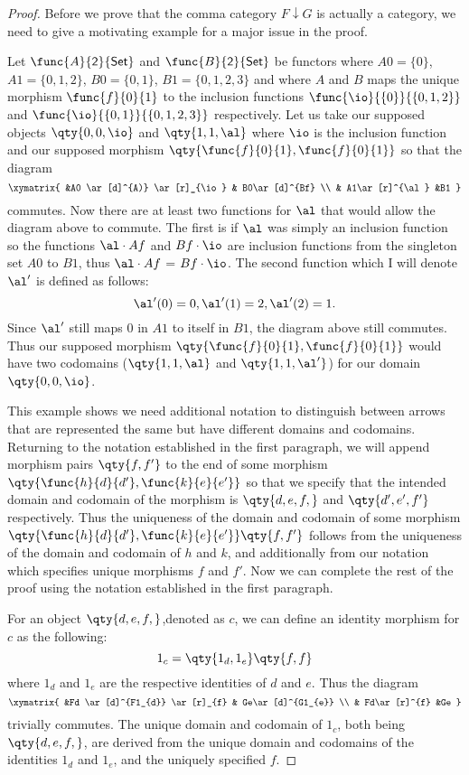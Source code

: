 \documentclass[main.tex]{subfiles}
\begin{document}
\begin{proof}
	Before we prove that the comma category $F\downarrow G$ is actually a
	category, we need to give a motivating example for a major issue in the
	proof.

	Let \(\func{A}{\mathsf{2}}{\mathsf{Set}}\) and
	\(\func{B}{\mathsf{2}}{\mathsf{Set}}\) be functors where $A0 = \{0\}$, $A1 =
	\{0,1,2\}$, $B0 = \{0,1\}$, $B1 = \{0,1,2,3\}$ and where $A$ and $B$ maps
	the unique morphism \(\func{f}{0}{1}\) to the inclusion functions
	\(\func{\io}{\{0\}}{\{0,1,2\}}\)  and \(\func{\io}{\{0,1\}}{\{0,1,2,3\}}\)
	respectively. Let us take our supposed objects $\qty{0,0,\io}$  and
	$\qty{1,1,\al}$ where $\io$ is the inclusion function and our supposed
	morphism $\qty{\func{f}{0}{1},\func{f}{0}{1}}$ so that the diagram
	\[\xymatrix{ &A0 \ar[d]^{A)} \ar[r]_{\io} & B0\ar[d]^{Bf}  \\  &
	A1\ar[r]^{\al} &B1   } \] commutes. Now there are at least two functions for
	$\al$ that would allow the diagram above to commute. The first is if $\al$
	was simply an inclusion function so the functions $\al \cdot Af$ and $Bf
	\cdot \io$ are inclusion functions from the singleton set $A0$ to $B1$, thus
	$\al \cdot Af$ =  $Bf \cdot \io$. The second function which I will denote
	$\al'$ is defined as follows:\[ \al'(0) = 0, \al'(1) = 2,\al'(2) = 1.\]
	Since $\al'$ still maps $0$ in $A1$ to itself in $B1$, the diagram above
	still commutes. Thus our supposed morphism
	$\qty{\func{f}{0}{1},\func{f}{0}{1}}$ would have two codomains
	($\qty{1,1,\al}$ and $\qty{1,1,\al'}$) for our domain $\qty{0,0,\io}$.

	This example shows we need additional notation to distinguish between arrows
	that are represented the same but have different domains and codomains.
	Returning to the notation established in the first paragraph, we will append
	morphism pairs $\qty{f,f'}$ to the end of some morphism
	$\qty{\func{h}{d}{d'},\func{k}{e}{e'}}$ so that we specify that the intended
	domain and codomain of the morphism is $\qty{d,e,f,}$ and $\qty{d',e',f'}$
	respectively. Thus the uniqueness of the domain and codomain of some
	morphism $\qty{\func{h}{d}{d'},\func{k}{e}{e'}} \qty{f,f'}$ follows from the
	uniqueness of the domain and codomain of $h$ and $k$, and additionally from
	our notation which specifies unique morphisms $f$ and $f'$. Now we can
	complete the rest of the proof using the notation established in the first
	paragraph.

	For an object $\qty{d,e,f,}$,denoted as $c$, we can define an identity
	morphism for $c$ as the following:  \[ 1_c  = \qty{1_{d},1_{e}}\qty{f,f}\]
	where $1_{d}$ and $1_{e}$ are the respective identities of $d$ and $e$. Thus
	the diagram \[\xymatrix{ &Fd \ar[d]^{F1_{d}} \ar[r]_{f} & Ge\ar[d]^{G1_{e}}
						 \\  & Fd\ar[r]^{f} &Ge   } \] trivially commutes. The
		unique domain and codomain of $1_c$, both being $\qty{d,e,f,}$, are
		derived from the unique domain and codomains of the identities $1_d$ and
		$1_e$, and the uniquely specified $f$.


\end{proof}
\end{document}
